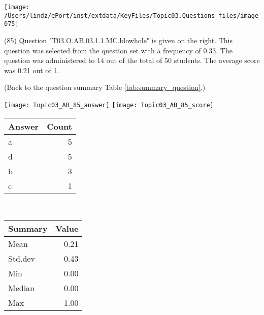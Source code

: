 \documentclass[12pt,english,nohyper]{tufte-handout}\usepackage[]{graphicx}\usepackage[]{color}
\begin{document}
\vspace{5cm}\begin{marginfigure}\texttt{[image: /Users/lindz/ePort/inst/extdata/KeyFiles/Topic03.Questions\_files/image075]}\end{marginfigure}\vspace{-5cm} (85) Question "T03.O.AB.03.1.1.MC.blowhole" is given on the right. This question was selected from the question set with a frequency of 0.33. The question was administered to 14 out of the total of 50 students. The average score was 0.21 out of 1.

 (Back to the question summary Table \ref{tab:summary_question}.)

\begin{center} \texttt{[image: Topic03\_AB\_85\_answer]} \texttt{[image: Topic03\_AB\_85\_score]} \end{center} 

\begin{center}%
\begin{tabular}{lr}
  \hline
Answer & Count \\ 
  \hline
a &   5 \\ 
  d &   5 \\ 
  b &   3 \\ 
  c &   1 \\ 
   \hline
\end{tabular}
~~~~~~~~%
\begin{tabular}{lr}
  \hline
Summary & Value \\ 
  \hline
Mean & 0.21 \\ 
  Std.dev & 0.43 \\ 
  Min & 0.00 \\ 
  Median & 0.00 \\ 
  Max & 1.00 \\ 
   \hline
\end{tabular}
\end{center}\newpage{}
\end{document}
